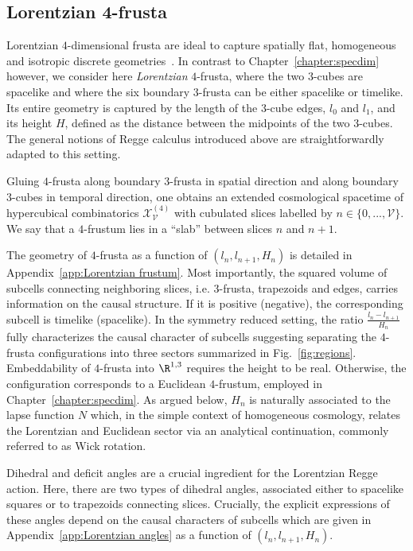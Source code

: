 \subsection{Lorentzian 4-frusta}\label{sec:Lorentzian frustum}

Lorentzian $4$-dimensional frusta are ideal to capture spatially flat, homogeneous and isotropic discrete geometries~\cite{Bahr:2017}. In contrast to Chapter~\ref{chapter:specdim} however, we consider here \emph{Lorentzian} $4$-frusta, where the two $3$-cubes are spacelike and where the six boundary $3$-frusta can be either spacelike or timelike. Its entire geometry is captured by the length of the $3$-cube edges, $l_0$ and $l_1$, and its height $H$, defined as the distance between the midpoints of the two $3$-cubes. The general notions of Regge calculus introduced above are straightforwardly adapted to this setting.  

Gluing $4$-frusta along boundary $3$-frusta in spatial direction and along boundary $3$-cubes in temporal direction, one obtains an extended cosmological spacetime of hypercubical combinatorics $\mathcal{X}^{(4)}_\mathcal{V}$ with cubulated slices labelled by $n\in\{0,...,\mathcal{V}\}$. We say that a $4$-frustum lies in a \enquote{slab} between slices $n$ and $n+1$.


The geometry of $4$-frusta as a function of $(l_n,l_{n+1},H_n)$ is detailed in Appendix~\ref{app:Lorentzian frustum}. Most importantly, the squared volume of subcells connecting neighboring slices, i.e. 3-frusta, trapezoids and edges, carries information on the causal structure. If it is positive (negative), the corresponding subcell is timelike (spacelike). In the symmetry reduced setting, the ratio $\frac{l_n-l_{n+1}}{H_n}$ fully characterizes the causal character of subcells suggesting separating the $4$-frusta configurations into three sectors summarized in Fig.~\ref{fig:regions}. Embeddability of $4$-frusta into $\R^{1,3}$ requires the height to be real. Otherwise, the configuration corresponds to a Euclidean $4$-frustum, employed in Chapter~\ref{chapter:specdim}.  As argued below, $H_n$ is naturally associated to the lapse function $N$ which, in the simple context of homogeneous cosmology, relates the Lorentzian and Euclidean sector via an analytical continuation, commonly referred to as Wick rotation.

Dihedral and deficit angles are a crucial ingredient for the Lorentzian Regge action. Here, there are two types of dihedral angles, associated either to spacelike squares or to trapezoids connecting slices. Crucially, the explicit expressions of these angles depend on the causal characters of subcells which are given in Appendix~\ref{app:Lorentzian angles} as a function of $(l_n,l_{n+1},H_n)$.

